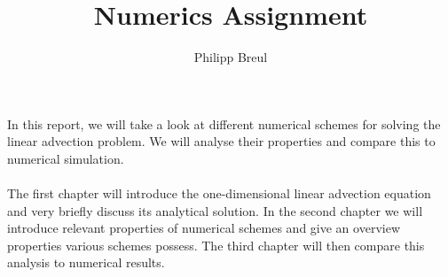 \documentclass[11pt,a4paper,onecolumn]{article}
\author{Philipp Breul}
\title{Numerics Assignment}
\numberwithin{equation}{section} %
\begin{document}
\maketitle
In this report, we will take a look at different numerical schemes for solving the linear advection problem. We will analyse their properties and compare this to numerical simulation. \\ \\
The first chapter will introduce the one-dimensional linear advection equation and very briefly discuss its analytical solution. In the second chapter we will introduce relevant properties of numerical schemes and give an overview properties various schemes possess. The third chapter will then compare this analysis to numerical results. 




\end{document}
